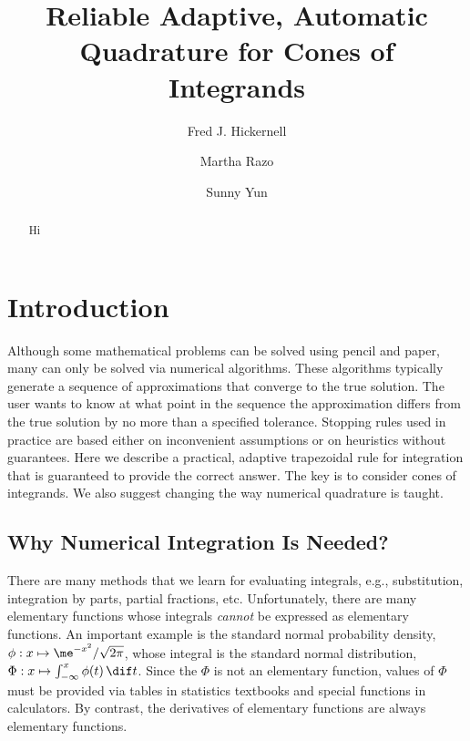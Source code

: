 \documentclass[]{amsart}
\theoremstyle{definition}
\theoremstyle{remark}
\begin{document}
\title{Reliable Adaptive, Automatic Quadrature for Cones of Integrands}
\author{Fred J. Hickernell}
\author{Martha Razo}
\author{Sunny Yun}
\maketitle 


\begin{abstract} Hi
\end{abstract}


\section{Introduction} 

Although some mathematical problems can be solved using pencil and paper, many can only be solved via numerical algorithms.  These algorithms typically generate a sequence of approximations that converge to the true solution.  The user wants to know at what point in the sequence the approximation differs from the true solution by no more than a specified tolerance. Stopping rules used in practice are based either on inconvenient assumptions or on heuristics without guarantees.  Here we describe a practical, adaptive trapezoidal rule for integration that is guaranteed to provide the correct answer.  The key is to consider cones of integrands.  We also suggest changing the way numerical quadrature is taught.

\subsection{Why Numerical Integration Is Needed?}
There are many methods that we learn for evaluating integrals, e.g., substitution, integration by parts, partial fractions, etc.  Unfortunately, there are many elementary functions whose integrals \emph{cannot} be expressed as elementary functions.  An important example is the standard normal probability density, $\phi: x \mapsto \me^{-x^2}/\sqrt{2 \pi}$, whose integral is the standard normal distribution, $\Phi : x \mapsto \int_{-\infty}^x \phi(t) \, \dif t$.  Since the $\Phi$ is not an elementary function, values of $\Phi$ must be provided via tables in statistics textbooks and special functions in calculators. By contrast, the derivatives of elementary functions are always elementary functions.  
\end{document}
